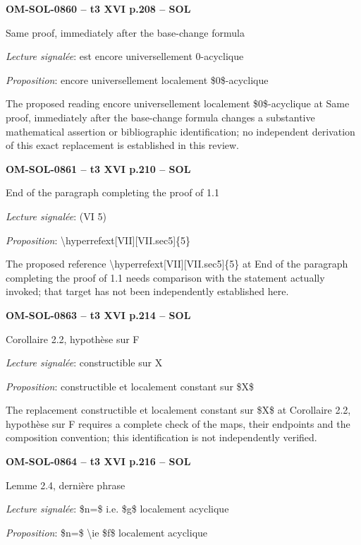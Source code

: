 \par\noindent\textbf{OM-SOL-0860 -- t3 XVI p.208 -- SOL}\par
Same proof, immediately after the base-change formula\par
\emph{Lecture signalée}: est encore universellement 0-acyclique\par
\emph{Proposition}: encore universellement localement \$0\$-acyclique\par
The proposed reading encore universellement localement \$0\$-acyclique at Same proof, immediately after the base-change formula changes a substantive mathematical assertion or bibliographic identification; no independent derivation of this exact replacement is established in this review.\par
\par\noindent\textbf{OM-SOL-0861 -- t3 XVI p.210 -- SOL}\par
End of the paragraph completing the proof of 1.1\par
\emph{Lecture signalée}: (VI 5)\par
\emph{Proposition}: \textbackslash{}hyperrefext[VII][VII.sec5]\{5\}\par
The proposed reference \textbackslash{}hyperrefext[VII][VII.sec5]\{5\} at End of the paragraph completing the proof of 1.1 needs comparison with the statement actually invoked; that target has not been independently established here.\par
\par\noindent\textbf{OM-SOL-0863 -- t3 XVI p.214 -- SOL}\par
Corollaire 2.2, hypothèse sur F\par
\emph{Lecture signalée}: constructible sur X\par
\emph{Proposition}: constructible et localement constant sur \$X\$\par
The replacement constructible et localement constant sur \$X\$ at Corollaire 2.2, hypothèse sur F requires a complete check of the maps, their endpoints and the composition convention; this identification is not independently verified.\par
\par\noindent\textbf{OM-SOL-0864 -- t3 XVI p.216 -- SOL}\par
Lemme 2.4, dernière phrase\par
\emph{Lecture signalée}: \$n=\$ i.e. \$g\$ localement acyclique\par
\emph{Proposition}: \$n=\$ \textbackslash{}ie \$f\$ localement acyclique\par
